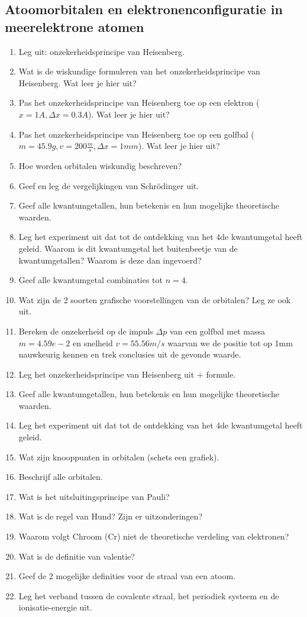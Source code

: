 \documentclass[a4paper,12pt]{article}
\begin{document}
    \subsection{Atoomorbitalen en elektronenconfiguratie in meerelektrone atomen}
    \begin{enumerate}
        \item Leg uit: onzekerheidsprincipe van Heisenberg.
        \item Wat is de wiskundige formuleren van het onzekerheidsprincipe van Heisenberg. Wat leer je hier uit?
        \item Pas het onzekerheidsprincipe van Heisenberg toe op een elektron ($x=1 A  , \Delta x = 0.3 A$). Wat leer je hier uit?
        \item Pas het onzekerheidsprincipe van Heisenberg toe op een golfbal ($m=45.9g , v=200 \frac{m}{s}, \Delta x = 1mm$). Wat leer je hier uit?
        \item Hoe worden orbitalen wiskundig beschreven?
        \item Geef en leg de vergelijkingen van Schrödinger uit.
        \item Geef alle kwantumgetallen, hun betekenis en hun mogelijke theoretische waarden.
        \item Leg het experiment uit dat tot de ontdekking van het 4de kwantumgetal heeft geleid. Waarom is dit kwantumgetal het buitenbeetje van de kwantumgetallen? Waarom is deze dan ingevoerd?
        \item Geef alle kwantumgetal combinaties tot $n=4$.
        \item Wat zijn de 2 soorten grafische voorstellingen van de orbitalen? Leg ze ook uit.
        \item Bereken de onzekerheid op de impuls $\Delta p$ van een golfbal met massa $m = 4.59e-2$ en
        snelheid $v = 55.56 m/s$ waarvan we de positie tot op 1mm nauwkeurig kennen en trek conclusies uit de gevonde waarde.
        \item Leg het onzekerheidsprincipe van Heisenberg uit + formule.
        \item Geef alle kwantumgetallen, hun betekenis en hun mogelijke theoretische waarden.
        \item Leg het experiment uit dat tot de ontdekking van het 4de kwantumgetal heeft geleid.
        \item Wat zijn knooppunten in orbitalen (schets een grafiek).
        \item Beschrijf alle orbitalen.
        \item Wat is het uitsluitingsprincipe van Pauli?
        \item Wat is de regel van Hund? Zijn er uitzonderingen?
        \item Waarom volgt Chroom (Cr) niet de theoretische verdeling van elektronen?
        \item Wat is de definitie van valentie?
        \item Geef de 2 mogelijke definities voor de straal van een atoom.
        \item Leg het verband tussen de covalente straal, het periodiek systeem en de ionisatie-energie uit.
    \end{enumerate}
\end{document}
